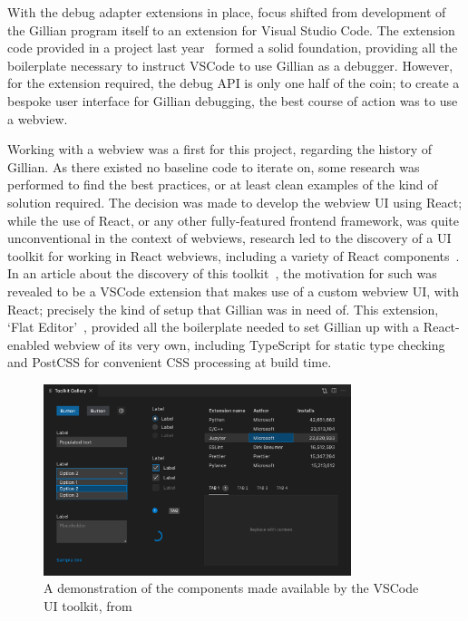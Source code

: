 With the debug adapter extensions in place, focus shifted from development of
the Gillian program itself to an extension for Visual Studio Code. The extension
code provided in a project last year~\cite{gillian-debugging-2021} formed a
solid foundation, providing all the boilerplate necessary to instruct VSCode to
use Gillian as a debugger. However, for the extension required, the debug API
is only one half of the coin; to create a bespoke user interface for Gillian
debugging, the best course of action was to use a webview.

Working with a webview was a first for this project, regarding the history of
Gillian. As there existed no baseline code to iterate on, some research was
performed to find the best practices, or at least clean examples of the kind
of solution required. The decision was made to develop the webview UI using
React; while the use of React, or any other fully-featured frontend framework,
was quite unconventional in the context of webviews, research led to the
discovery of a UI toolkit for working in React webviews, including a variety
of React components~\cite{vscode-ui-toolkit}. In an article about the discovery
of this toolkit~\cite{vscode-ui-toolkit-article}, the motivation for such was
revealed to be a VSCode extension that makes use of a custom webview UI, with
React; precisely the kind of setup that Gillian was in need of. This extension,
`Flat Editor'~\cite{flat-editor}, provided all the boilerplate needed to set
Gillian up with a React-enabled webview of its very own, including TypeScript
for static type checking and PostCSS for convenient CSS processing at build
time.

\begin{figure}
  \center{}
  \includegraphics[width=0.8\textwidth]{img/vscode-ui-toolkit-demo.png}
  \caption{
    A demonstration of the components made available by the VSCode UI toolkit,
    from~\cite{vscode-ui-toolkit}}%
  \label{fig:vscode-ui-toolkit-demo}
\end{figure}

